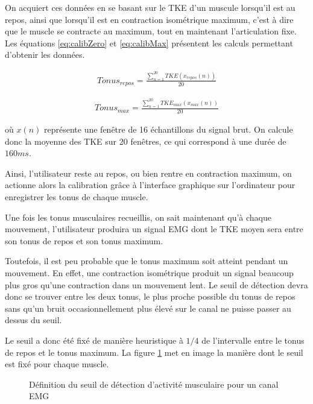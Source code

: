 \documentclass[letterpaper, twoside, 12pt, memoire, creativecommons, hyperref]{thETS}
\begin{document}
On acquiert ces données en se basant sur le TKE d'un muscule lorsqu'il est au repos, ainsi que lorsqu'il est en contraction isométrique maximum, c'est à dire que le muscle se contracte au maximum, tout en maintenant l'articulation fixe. Les équations \ref{eq:calibZero} et \ref{eq:calibMax} présentent les calculs permettant d'obtenir les données.

\begin{align}\label{eq:calibZero}
   Tonus_{repos} = \frac{\sum_{n=1}^{20}TKE(x_{repos}(n))}{20} 
\end{align}

\begin{align}\label{eq:calibMax}
   Tonus_{max} = \frac{\sum_{n=1}^{20}TKE_{max}(x_{max}(n))}{20} 
\end{align}

où $x(n)$ représente une fenêtre de 16 échantillons du signal brut. On calcule donc la moyenne des TKE sur 20 fenêtres, ce qui correspond à une durée de $160ms$. 

Ainsi, l'utilisateur reste au repos, ou bien rentre en contraction maximum, on actionne alors la calibration grâce à l'interface graphique sur l'ordinateur pour enregistrer les tonus de chaque muscle.

Une fois les tonus musculaires recueillis, on sait maintenant qu'à chaque mouvement, l'utilisateur produira un signal EMG dont le TKE moyen sera entre son tonus de repos et son tonus maximum. 

Toutefois, il est peu probable que le tonus maximum soit atteint pendant un mouvement. En effet, une contraction isométrique produit un signal beaucoup plus gros qu'une contraction dans un mouvement lent. Le seuil de détection devra donc se trouver entre les deux tonus, le plus proche possible du tonus de repos sans qu'un bruit occasionnellement plus élevé sur le canal ne puisse passer au dessus du seuil. 

Le seuil a donc été fixé de manière heuristique à $1/4$ de l'intervalle entre le tonus de repos et le tonus maximum. La figure \ref{fig:seuilDetection} met en image la manière dont le seuil est fixé pour chaque muscle.

\begin{figure}
	\centering
	\caption{Définition du seuil de détection d'activité musculaire pour un canal EMG}
	\label{fig:seuilDetection}
\end{figure}
\end{document}
